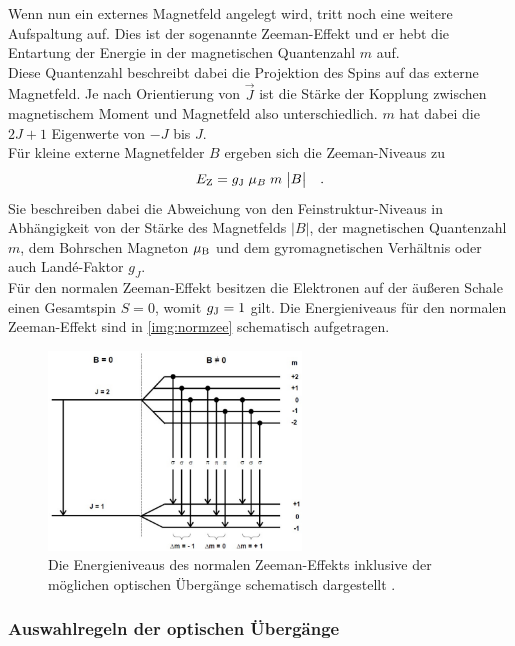 \noindent
Wenn nun ein externes Magnetfeld angelegt wird, tritt noch eine weitere Aufspaltung auf.
Dies ist der sogenannte Zeeman-Effekt und er hebt die Entartung der Energie in der magnetischen Quantenzahl $m$ auf.\\
Diese Quantenzahl beschreibt dabei die Projektion des Spins auf das externe Magnetfeld. 
Je nach Orientierung von $\vec J$ ist die Stärke der Kopplung zwischen magnetischem Moment und Magnetfeld also unterschiedlich.
$m$ hat dabei die $2J+1$ Eigenwerte von $-J$ bis $J$.\\
Für kleine externe Magnetfelder $B$  ergeben sich die Zeeman-Niveaus zu 
\begin{equation}
    E_{\text{Z}} = g_{\text{J}}\; \mu_B \; m \;\bigl| B \bigr|\quad .
    \label{eqn:zeeman}
\end{equation}
Sie beschreiben dabei die Abweichung von den Feinstruktur-Niveaus in Abhängigkeit von der Stärke des Magnetfelds $\bigl| B \bigr|$, 
der magnetischen Quantenzahl $m$, dem Bohrschen Magneton $\mu_{\text{B}}$ und dem gyromagnetischen Verhältnis oder auch Landé-Faktor $g_J$.\\
Für den normalen Zeeman-Effekt besitzen die Elektronen auf der äußeren Schale einen Gesamtspin $S=0$, womit $g_{\text{J}} = 1$ gilt.
Die Energieniveaus für den normalen Zeeman-Effekt sind in \autoref{img:normzee} schematisch aufgetragen.
\begin{figure}[H]
    \centering
    \includegraphics[width=0.6\textwidth]{latex/images/normalerzeeman.PNG}
    \caption{Die Energieniveaus des normalen Zeeman-Effekts inklusive der möglichen optischen Übergänge schematisch dargestellt \protect \cite{alt}.}
    \label{img:normzee}
\end{figure}

\subsubsection{Auswahlregeln der optischen Übergänge}

